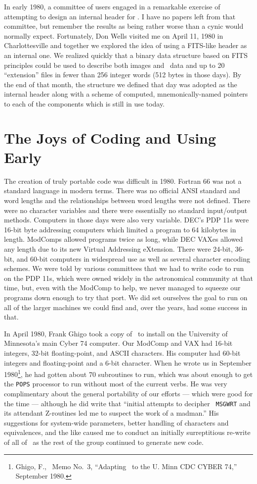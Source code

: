 In early 1980, a committee of users engaged in a remarkable exercise
of attempting to design an internal header for \hbox{\VPOPS}. I have
no papers left from that committee, but remember the results as being
rather worse than a cynic would normally expect.  Fortunately, Don
Wells visited me on April 11, 1980 in Charlottesville and together we
explored the idea of using a FITS-like header as an internal one.  We
realized quickly that a binary data structure based on FITS principles
could be used to describe both images and \uv\ data and up to 20
``extension'' files in fewer than 256 integer words (512 bytes in
those days).  By the end of that month, the structure we defined that
day was adopted as the internal header along with a scheme of
computed, mnemonically-named pointers to each of the components which
is still in use today.

\section{The Joys of Coding and Using Early \AIPS}

The creation of truly portable code was difficult in 1980.  Fortran
66 was not a standard language in modern terms.  There was no official
ANSI standard and word lengths and the relationships between word
lengths were not defined.  There were no character variables and there
were essentially no standard input/output methods.  Computers in those
days were also very variable.  DEC's PDP 11s were 16-bit byte
addressing computers which limited a program to 64 kilobytes in
length.  ModComps allowed programs twice as long, while DEC VAXes
allowed any length due to its new Virtual Addressing eXtension.  There
were 24-bit, 36-bit, and 60-bit computers in widespread use as well as
several character encoding schemes.  We were told by various
committees that we had to write code to run on the PDP 11s, which were
owned widely in the astronomical community at that time, but, even
with the ModComp to help, we never managed to squeeze our programs
down enough to try that port.  We did set ourselves the goal to run on
all of the larger machines we could find and, over the years, had some
success in that.

In April 1980, Frank Ghigo took a copy of \RANCID\ to install on the
University of Minnesota's main Cyber 74 computer.  Our ModComp and VAX
had 16-bit integers, 32-bit floating-point, and ASCII characters.  His
computer had 60-bit integers and floating-point and a 6-bit character.
When he wrote us in September 1980\footnote{Ghigo, F., \AIPS\ Memo
No.~3, ``Adapting \RANCID\ to the U. Minn CDC CYBER 74,'' September
1980.\label{fn:Gh1980}}, he had gotten about 70 subroutines to run,
which was about enough to get the {\tt POPS} processor to run without
most of the current verbs.  He was very complimentary about the
general portability of our efforts --- which were good for the time
--- although he did write that ``initial attempts to decipher {\tt
MSGWRT} and its attendant Z-routines led me to suspect the work of a
madman.'' His suggestions for system-wide parameters, better handling
of characters and equivalences, and the like caused me to conduct an
initially surreptitious re-write of all of \RANCID\ as the rest of the
group continued to generate new code.

